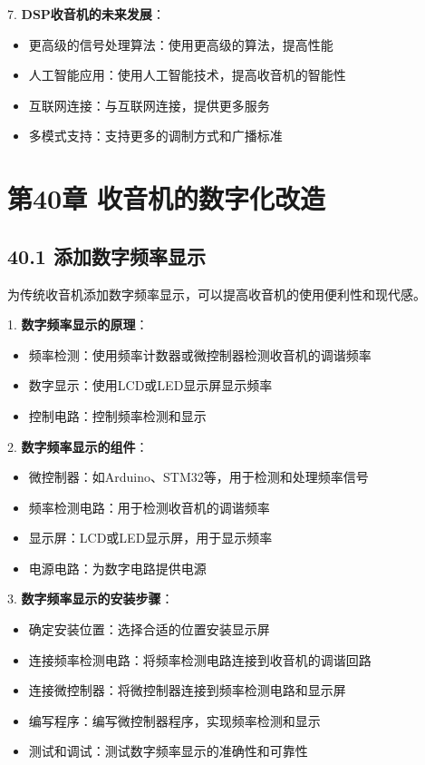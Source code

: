 \documentclass[12pt,UTF8]{ctexbook}
\begin{document}
7. \textbf{DSP收音机的未来发展}：
   \begin{itemize}[leftmargin=3.5em]
   \item 更高级的信号处理算法：使用更高级的算法，提高性能
   \item 人工智能应用：使用人工智能技术，提高收音机的智能性
   \item 互联网连接：与互联网连接，提供更多服务
   \item 多模式支持：支持更多的调制方式和广播标准
   \end{itemize}

\chapter*{第40章 收音机的数字化改造}
\section*{40.1 添加数字频率显示}

为传统收音机添加数字频率显示，可以提高收音机的使用便利性和现代感。

1. \textbf{数字频率显示的原理}：
   \begin{itemize}[leftmargin=3.5em]
   \item 频率检测：使用频率计数器或微控制器检测收音机的调谐频率
   \item 数字显示：使用LCD或LED显示屏显示频率
   \item 控制电路：控制频率检测和显示
   \end{itemize}

2. \textbf{数字频率显示的组件}：
   \begin{itemize}[leftmargin=3.5em]
   \item 微控制器：如Arduino、STM32等，用于检测和处理频率信号
   \item 频率检测电路：用于检测收音机的调谐频率
   \item 显示屏：LCD或LED显示屏，用于显示频率
   \item 电源电路：为数字电路提供电源
   \end{itemize}

3. \textbf{数字频率显示的安装步骤}：
   \begin{itemize}[leftmargin=3.5em]
   \item 确定安装位置：选择合适的位置安装显示屏
   \item 连接频率检测电路：将频率检测电路连接到收音机的调谐回路
   \item 连接微控制器：将微控制器连接到频率检测电路和显示屏
   \item 编写程序：编写微控制器程序，实现频率检测和显示
   \item 测试和调试：测试数字频率显示的准确性和可靠性
   \end{itemize}
\end{document}
